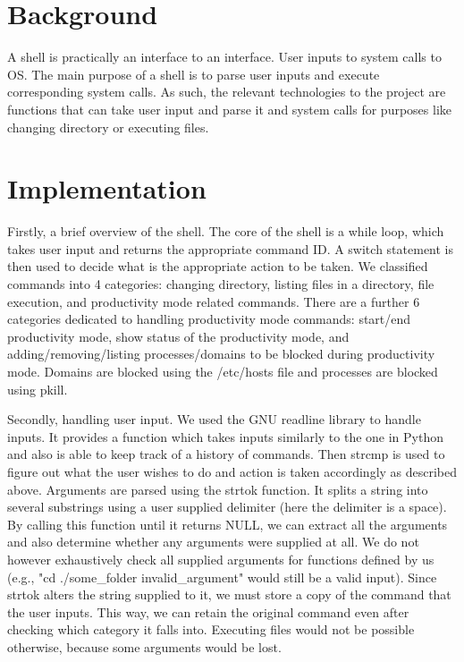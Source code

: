 \documentclass{article}
\begin{document}
\section{Background}

A shell is practically an interface to an interface. User inputs to system calls to OS. The main purpose of a shell is to parse user inputs and execute corresponding system calls. As such, the relevant technologies to the project are functions that can take user input and parse it and system calls for purposes like changing directory or executing files.

\section{Implementation}

Firstly, a brief overview of the shell. The core of the shell is a while loop, which takes user input and returns the appropriate command ID. A switch statement is then used to decide what is the appropriate action to be taken. We classified commands into 4 categories: changing directory, listing files in a directory, file execution, and productivity mode related commands. There are a further 6 categories dedicated to handling productivity mode commands: start/end productivity mode, show status of the productivity mode, and adding/removing/listing processes/domains to be blocked during productivity mode. Domains are blocked using the /etc/hosts file and processes are blocked using pkill.

Secondly, handling user input. We used the GNU readline library to handle inputs. It provides a function which takes inputs similarly to the one in Python and also is able to keep track of a history of commands.  Then strcmp is used to figure out what the user wishes to do and action is taken accordingly as described above. Arguments are parsed using the strtok function. It splits a string into several substrings using a user supplied delimiter (here the delimiter is a space). By calling this function until it returns NULL, we can extract all the arguments and also determine whether any arguments were supplied at all. We do not however exhaustively check all supplied arguments for functions defined by us (e.g., "cd ./some\_folder invalid\_argument" would still be a valid input). Since strtok alters the string supplied to it, we must store a copy of the command that the user inputs. This way, we can retain the original command even after checking which category it falls into. Executing files would not be possible otherwise, because some arguments would be lost.
\end{document}
